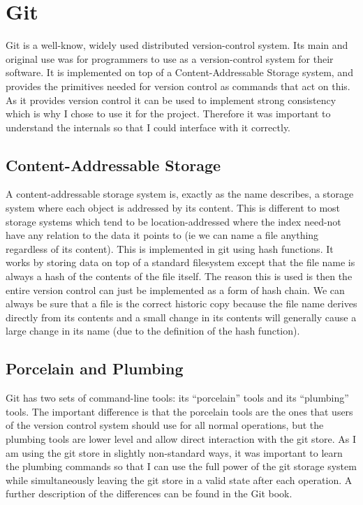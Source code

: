 \section{Git}

Git\cite{code_git} is a well-know, widely used distributed version-control system. Its main and original use was for programmers to use as a version-control system for their software\cite{TODO}. It is implemented on top of a Content-Addressable Storage system, and provides the primitives needed for version control as commands that act on this. As it provides version control it can be used to implement strong consistency which is why I chose to use it for the project. Therefore it was important to understand the internals so that I could interface with it correctly.

\subsection{Content-Addressable Storage}

A content-addressable storage system is, exactly as the name describes, a storage system where each object is addressed by its content. This is different to most storage systems which tend to be location-addressed where the index need-not have any relation to the data it points to (ie we can name a file anything regardless of its content). This is implemented in git using hash functions. It works by storing data on top of a standard filesystem except that the file name is always a hash of the contents of the file itself. The reason this is used is then the entire version control can just be implemented as a form of hash chain. We can always be sure that a file is the correct historic copy because the file name derives directly from its contents and a small change in its contents will generally cause a large change in its name (due to the definition of the hash function). 

\subsection{Porcelain and Plumbing}

Git has two sets of command-line tools: its ``porcelain'' tools and its ``plumbing'' tools. The important difference is that the porcelain tools are the ones that users of the version control system should use for all normal operations, but the plumbing tools are lower level and allow direct interaction with the git store. As I am using the git store in slightly non-standard ways, it was important to learn the plumbing commands so that I can use the full power of the git storage system while simultaneously leaving the git store in a valid state after each operation. A further description of the differences can be found in the Git book\cite{chacon2014git}.


